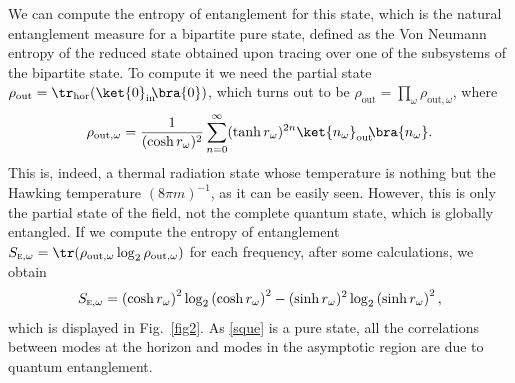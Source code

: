 We can compute the entropy of entanglement for this state, which is the
 natural entanglement measure for a bipartite pure state,
defined as the Von Neumann entropy of  the reduced state obtained upon
tracing over one of the subsystems of the bipartite state. To compute it
we need the partial state
$\rho_{\text{out}}=\tr_{\text{hor}}(\ket{0}_{\text{in}}\!\!\bra{0})$,
which turns out to be
$\rho_{\text{out}}=\prod_\omega\rho_{\text{out},\omega}$, where
\begin{equation}
\rho_{\text{out},\omega}=\frac{1}{(\cosh r_{\omega})^2}
\sum_{n=0}^\infty (\tanh r_{\omega})^{2n}
\ket{n_{\omega}}_{\text{out}}\!\!\bra{n_{\omega}}.
\end{equation}
This is, indeed, a thermal radiation state  whose temperature is nothing
but the Hawking temperature $(8\pi m)^{-1}$, as  it can be easily
seen. However, this is only the partial state of the field, not the complete
quantum state, which is globally  entangled. If we compute the entropy of
entanglement
$S_{\textsc{e},\omega}=\tr(\rho_{\text{out},\omega}\log_2
\rho_{\text{out},\omega})$ for each frequency, after some calculations, we obtain
\begin{equation}
 S_{\textsc{e},\omega}=
\left(\cosh r_\omega\right)^2\log_2\left(\cosh r_\omega\right)^2-(\sinh r_\omega)^2\log_2\left(\sinh r_\omega\right)^2,
\end{equation}
which is displayed in Fig.~\ref{fig2}. As \eqref{sque} is a pure state, all
the correlations between modes at the horizon and modes in the
asymptotic region are due to quantum entanglement.

